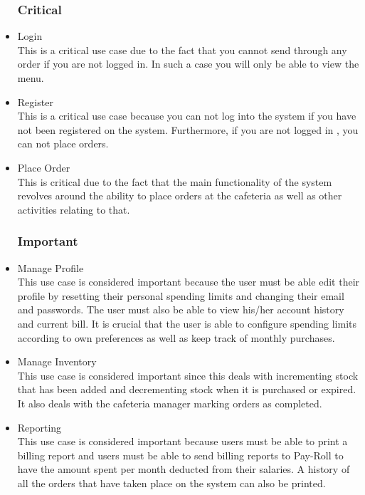 \documentclass[a4paper,12pt]{article}
\begin{document}
\begin{itemize}

\subsubsection{Critical}
\item Login \\
This is a critical use case due to the fact that you cannot send through any order if you are not logged in. In such a case you will only be able to view the menu. 
 
\item Register \\
This is a critical use case because you can not log into the system if you have not been registered on the system. Furthermore, if you are not logged in , you can not place orders.

\item Place Order\\
This is critical due to the fact that the main functionality of the system revolves around the ability to place orders at the cafeteria as well as other activities relating to that. 

\subsubsection{Important}
\item Manage Profile \\
This use case is considered important because the user must be able edit their profile by resetting their personal spending limits and changing their email and passwords. The user must also be able to view his/her account history and current bill. It is crucial that the user is able to configure spending limits according to own preferences as well as keep track of monthly purchases.

\item Manage Inventory \\
This use case is considered important since this deals with incrementing stock that has been added and decrementing stock when it is purchased or expired. It also deals with the cafeteria manager marking orders as completed.

\item Reporting \\ 
This use case is considered important because users must be able to print a billing report and users must be able to send billing reports to Pay-Roll to have the amount spent per month deducted from their salaries. A history of all the orders that have taken place on the system can also be printed. 


\end{itemize}
\end{document}
